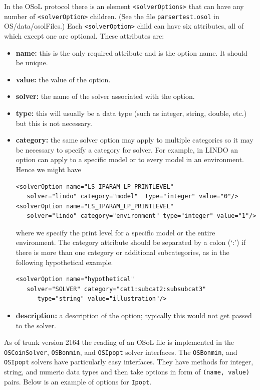 \documentclass[11pt]{article}
\renewcommand{\_}{{\char"5F}}
\renewcommand{\{}{{\char"7B}}
\renewcommand{\}}{{\char"7D}}
\renewcommand{\^}{{\char"0D}}
\renewcommand{\'}{{\char"0D}}
\begin{document}
\begin{enumerate}[Step 1:]
In the OSoL protocol there is an element {\tt <solverOptions>} that can have any number of {\tt <solverOption>} 
children. (See the file {\tt parsertest.osol} in OS/data/osolFiles.)  Each {\tt <solverOption>} child can have 
six attributes, all of which except one are optional. These attributes are:

\begin{itemize}

\item {\bf name:} this is the only required attribute and is the option name. It should be unique.

\item {\bf value:}  the value of the option.

\item {\bf solver:} the name of the solver associated with the option.

\item {\bf type:} this will usually be a data type (such as integer, string, double, etc.) but this is not necessary.

\item {\bf category:} the same solver option may apply to multiple categories so it may be necessary to specify a 
category for solver. For example, in LINDO an option can apply to a specific model or to every model in an environment. 
Hence we might have

\begin{verbatim}
<solverOption name="LS_IPARAM_LP_PRINTLEVEL" 
   solver="lindo" category="model"  type="integer" value="0"/>
<solverOption name="LS_IPARAM_LP_PRINTLEVEL" 
   solver="lindo" category="environment" type="integer" value="1"/>
\end{verbatim}
where we specify the print level for a specific model or the entire environment.   The category attribute should be 
separated by a colon (`:') if there is more than one  category or  additional subcategories, 
as in the following hypothetical example.
\begin{verbatim}
<solverOption name="hypothetical" 
   solver="SOLVER" category="cat1:subcat2:subsubcat3" 
      type="string" value="illustration"/>
\end{verbatim}

\item {\bf description:} a description of the option; typically this would not get passed to the solver.

\end{itemize}

As of trunk version 2164 the reading of an OSoL file is implemented in the {\tt OSCoinSolver}, 
{\tt OSBonmin}, and {\tt OSIpopt} solver interfaces.   The  {\tt OSBonmin}, and {\tt OSIpopt} solvers have 
particularly easy interfaces. 
They have methods for integer, string, and numeric data types and then take options in form of {\tt (name, value)} pairs.
Below is an example of options for {\tt Ipopt}.



\end{enumerate}
\end{document}
